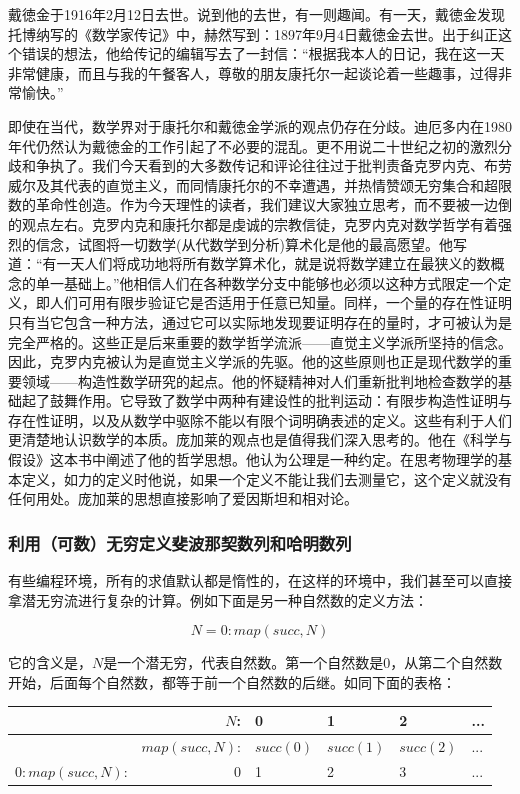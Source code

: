 \documentclass{article}
\begin{document}
戴徳金于1916年2月12日去世。说到他的去世，有一则趣闻。有一天，戴徳金发现托博纳写的《数学家传记》中，赫然写到：1897年9月4日戴徳金去世。出于纠正这个错误的想法，他给传记的编辑写去了一封信：“根据我本人的日记，我在这一天非常健康，而且与我的午餐客人，尊敬的朋友康托尔一起谈论着一些趣事，过得非常愉快。”\cite{HanXueTao16}

即使在当代，数学界对于康托尔和戴徳金学派的观点仍存在分歧。迪厄多内在1980年代仍然认为戴徳金的工作引起了不必要的混乱。更不用说二十世纪之初的激烈分歧和争执了。我们今天看到的大多数传记和评论往往过于批判责备克罗内克、布劳威尔及其代表的直觉主义，而同情康托尔的不幸遭遇，并热情赞颂无穷集合和超限数的革命性创造。作为今天理性的读者，我们建议大家独立思考，而不要被一边倒的观点左右。克罗内克和康托尔都是虔诚的宗教信徒，克罗内克对数学哲学有着强烈的信念，试图将一切数学(从代数学到分析)算术化是他的最高愿望。他写道：“有一天人们将成功地将所有数学算术化，就是说将数学建立在最狭义的数概念的单一基础上。”他相信人们在各种数学分支中能够也必须以这种方式限定一个定义，即人们可用有限步验证它是否适用于任意已知量。同样，一个量的存在性证明只有当它包含一种方法，通过它可以实际地发现要证明存在的量时，才可被认为是完全严格的。这些正是后来重要的数学哲学流派——直觉主义学派所坚持的信念。因此，克罗内克被认为是直觉主义学派的先驱。他的这些原则也正是现代数学的重要领域——构造性数学研究的起点。他的怀疑精神对人们重新批判地检查数学的基础起了鼓舞作用。它导致了数学中两种有建设性的批判运动：有限步构造性证明与存在性证明，以及从数学中驱除不能以有限个词明确表述的定义。这些有利于人们更清楚地认识数学的本质。庞加莱的观点也是值得我们深入思考的。他在《科学与假设》这本书中阐述了他的哲学思想。他认为公理是一种约定。在思考物理学的基本定义，如力的定义时他说，如果一个定义不能让我们去测量它，这个定义就没有任何用处。庞加莱的思想直接影响了爱因斯坦和相对论。

\subsubsection{利用（可数）无穷定义斐波那契数列和哈明数列}

有些编程环境，所有的求值默认都是惰性的，在这样的环境中，我们甚至可以直接拿潜无穷流进行复杂的计算。例如下面是另一种自然数的定义方法：

\[
N = 0 : map(succ, N)
\]

它的含义是，$N$是一个潜无穷，代表自然数。第一个自然数是0，从第二个自然数开始，后面每个自然数，都等于前一个自然数的后继。如同下面的表格：

\begin{tabular}{|r|r|l|l|l|l|}
\hline
                 & $N$: & 0 & 1 & 2 & ... \\
\hline
                 & $map(succ, N)$: & $succ(0)$ & $succ(1)$ & $succ(2)$ & ... \\
\hline
$0 : map(succ, N)$: & 0 & 1 & 2 & 3 & ... \\
\hline
\end{tabular}
\end{document}
